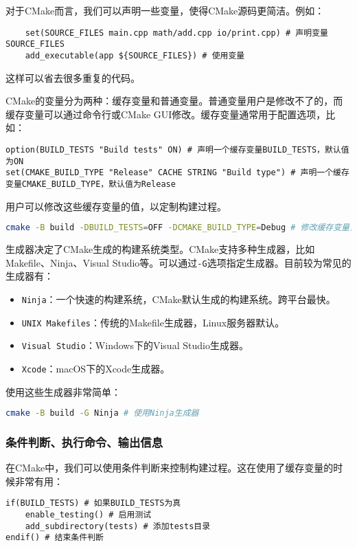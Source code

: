 对于CMake而言，我们可以声明一些变量，使得CMake源码更简洁。例如：
\begin{lstlisting}
    set(SOURCE_FILES main.cpp math/add.cpp io/print.cpp) # 声明变量SOURCE_FILES
    add_executable(app ${SOURCE_FILES}) # 使用变量
\end{lstlisting}
这样可以省去很多重复的代码。

CMake的变量分为两种：缓存变量和普通变量。普通变量用户是修改不了的，而缓存变量可以通过命令行或CMake GUI修改。缓存变量通常用于配置选项，比如：
\begin{lstlisting}
option(BUILD_TESTS "Build tests" ON) # 声明一个缓存变量BUILD_TESTS，默认值为ON
set(CMAKE_BUILD_TYPE "Release" CACHE STRING "Build type") # 声明一个缓存变量CMAKE_BUILD_TYPE，默认值为Release
\end{lstlisting}

用户可以修改这些缓存变量的值，以定制构建过程。
\begin{lstlisting}[language=bash]
cmake -B build -DBUILD_TESTS=OFF -DCMAKE_BUILD_TYPE=Debug # 修改缓存变量，将BUILD_TESTS设置为OFF，将CMAKE_BUILD_TYPE设置为Debug
\end{lstlisting}

生成器决定了CMake生成的构建系统类型。CMake支持多种生成器，比如Makefile、Ninja、Visual Studio等。可以通过\texttt{-G}选项指定生成器。目前较为常见的生成器有：

\begin{itemize}
  \item \texttt{Ninja}：一个快速的构建系统，CMake默认生成的构建系统。跨平台最快。
  \item \texttt{UNIX Makefiles}：传统的Makefile生成器，Linux服务器默认。
  \item \texttt{Visual Studio}：Windows下的Visual Studio生成器。
  \item \texttt{Xcode}：macOS下的Xcode生成器。
\end{itemize}
使用这些生成器非常简单：
\begin{lstlisting}[language=bash]
cmake -B build -G Ninja # 使用Ninja生成器
\end{lstlisting}

\subsubsection{条件判断、执行命令、输出信息}

在CMake中，我们可以使用条件判断来控制构建过程。这在使用了缓存变量的时候非常有用：
\begin{lstlisting}
if(BUILD_TESTS) # 如果BUILD_TESTS为真
    enable_testing() # 启用测试
    add_subdirectory(tests) # 添加tests目录
endif() # 结束条件判断
\end{lstlisting}

